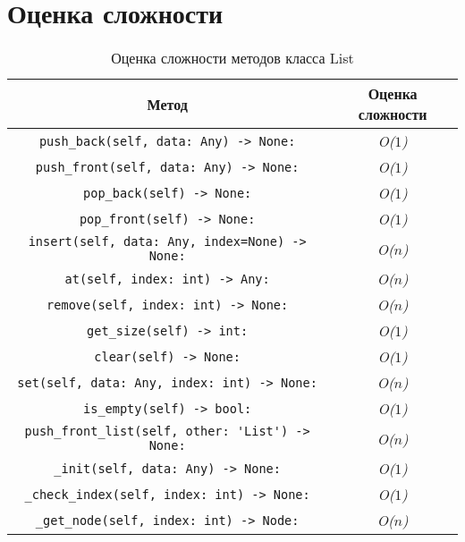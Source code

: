 \section*{Оценка сложности}

\begin{table}[H]
    \centering
    \caption{Оценка сложности методов класса List}
    \begin{tabular}{|c|c|}
        \hline
        Метод & Оценка сложности \\ 
        \hline
        \verb|push_back(self, data: Any) -> None:| & \textit{O($ 1 $)} \\ 
        \hline
        \verb|push_front(self, data: Any) -> None:| & \textit{O($ 1 $)} \\ 
        \hline
        \verb|pop_back(self) -> None:| & \textit{O($ 1 $)} \\ 
        \hline
        \verb|pop_front(self) -> None:| & \textit{O($ 1 $)} \\ 
        \hline
        \verb|insert(self, data: Any, index=None) -> None:| & \textit{O($ n $)} \\ 
        \hline
        \verb|at(self, index: int) -> Any:| & \textit{O($ n $)} \\ 
        \hline
        \verb|remove(self, index: int) -> None:| & \textit{O($ n $)} \\ 
        \hline
        \verb|get_size(self) -> int:| & \textit{O($ 1 $)} \\ 
        \hline
        \verb|clear(self) -> None:| & \textit{O($ 1 $)} \\ 
        \hline
        \verb|set(self, data: Any, index: int) -> None:| & \textit{O($ n $)} \\ 
        \hline
        \verb|is_empty(self) -> bool:| & \textit{O($ 1 $)} \\ 
        \hline
        \verb|push_front_list(self, other: 'List') -> None:| & \textit{O($ n $)} \\ 
        \hline
        \verb|_init(self, data: Any) -> None:| & \textit{O($ 1 $)} \\ 
        \hline
        \verb|_check_index(self, index: int) -> None:| & \textit{O($ 1 $)} \\ 
        \hline
        \verb|_get_node(self, index: int) -> Node:| & \textit{O($ n $)} \\ 
        \hline
    \end{tabular}
\end{table}


